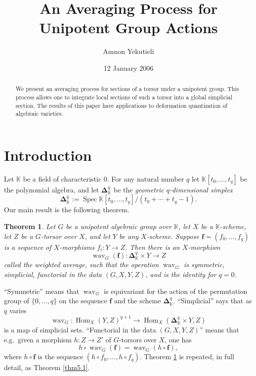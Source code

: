 \documentclass[10pt]{amsart}
\author{Amnon Yekutieli}
\title[An Averaging Process]
{An Averaging Process for Unipotent Group Actions}
\date{12 January 2006}
\newtheorem{thm}[equation]{Theorem}
\theoremstyle{definition}
\numberwithin{equation}{section}
\newcommand{\opn}{\operatorname}
\newcommand{\mbb}[1]{\mathbb{#1}}
\newcommand{\bsym}[1]{\boldsymbol{#1}}
\newcommand{\K}{\mbb{K}}
\begin{document}
\begin{abstract}
We present an averaging process for sections of a torsor under a 
unipotent group. This process allows one to integrate local sections 
of such a torsor into a global simplicial section. 
The results of this paper have 
applications to deformation quantization of algebraic varieties. 
\end{abstract}

\maketitle


\setcounter{section}{-1}
\section{Introduction}

Let $\K$ be a field of characteristic $0$. For any natural number
$q$ let $\K [t_0, \ldots, t_q]$ be the polynomial algebra, and let
$\bsym{\Delta}^q_{\K}$ be the {\em geometric 
$q$-dimensional simplex}
\[ \bsym{\Delta}^q_{\K} := \opn{Spec}
\K [t_0, \ldots, t_q] / (t_0 + \cdots + t_q - 1) . \] 
Our main result is the following theorem. 

\begin{thm} \label{thm0.1}
Let $G$ be a unipotent algebraic group over 
$\K$, let $X$ be a $\K$-scheme, let $Z$ be a $G$-torsor over $X$, 
and let $Y$ be any $X$-scheme. Suppose
$\bsym{f} = (f_0, \ldots, f_q)$ is a sequence of $X$-morphisms
$f_i : Y \to Z$. Then there is an $X$-morphism
\[ \opn{wav}_G(\bsym{f}) : \bsym{\Delta}^q_{\K} \times Y \to Z  \]
called the {\em weighted average}, such that 
the operation $\opn{wav}_G$ is 
symmetric, simplicial, functorial in the data $(G, X, Y, Z)$, 
and is the identity for $q = 0$. 
\end{thm}

``Symmetric'' means that $\opn{wav}_G$ is equivariant for the 
action of the permutation group of $\{0, \ldots, q \}$ on the 
sequence $\bsym{f}$ and the scheme $\bsym{\Delta}^q_{\K}$.
``Simplicial'' says that as $q$ varies
\[ \opn{wav}_G : \opn{Hom}_X(Y, Z)^{q+1} \to
\opn{Hom}_X(\bsym{\Delta}^q_{\K} \times Y, Z) \]
is a map of simplicial sets. ``Functorial in the data 
$(G, X, Y, Z)$'' means that e.g.\ given a morphism 
$h : Z \to Z'$ of $G$-torsors over $X$, one has
\[ h \circ \opn{wav}_G(\bsym{f}) = \opn{wav}_G(h \circ \bsym{f}), 
\]
where $h \circ \bsym{f}$ is the sequence
$(h \circ f_0, \ldots, h \circ f_q)$. 
Theorem \ref{thm0.1} is repeated, in full detail, as 
Theorem \ref{thm5.1}. 
\end{document}
